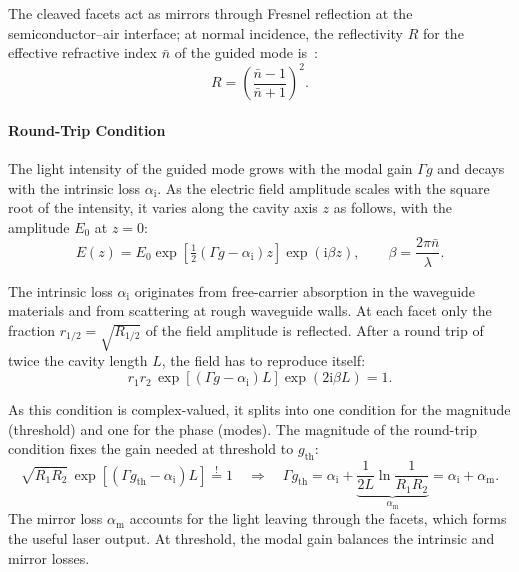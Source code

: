 The cleaved facets act as mirrors through Fresnel reflection at the
semiconductor–air interface; at normal incidence, the reflectivity $R$ for the
effective refractive index $\bar n$ of the guided mode is~\cite{grundmann_physics_2021}:
\begin{equation}
	R=\left(\frac{\bar n-1}{\bar n+1}\right)^{2}.
\end{equation}

\paragraph{Round-Trip Condition}

The light intensity of the guided mode grows with the modal gain $\Gamma g$ and
decays with the intrinsic loss $\alpha_{\mathrm{i}}$. As the electric field amplitude
scales with the square root of the intensity, it varies along the cavity axis $z$ as
follows, with the amplitude $E_{0}$ at $z=0$:
\begin{equation}
	E(z)=E_{0}\exp\left[\tfrac{1}{2}(\Gamma g-\alpha_{\mathrm{i}})z\right]\exp(\mathrm{i}
	\beta z),\qquad \beta=\frac{2\pi\bar n}{\lambda}.
\end{equation}

The intrinsic loss $\alpha_{\mathrm{i}}$ originates from free-carrier absorption in
the waveguide materials and from scattering at rough waveguide walls. At each
facet only the fraction $r_{1/2}=\sqrt{R_{1/2}}$ of the field amplitude is reflected. After
a round trip of twice the cavity length $L$, the field has to reproduce itself:
\begin{equation}
	r_{1} r_{2}\,\exp\left[(\Gamma g-\alpha_{\mathrm{i}})L\right]\exp(2\mathrm{i}\beta
	L)=1.
\end{equation}

As this condition is complex-valued, it splits into one condition for the
magnitude (threshold) and one for the phase (modes).
The magnitude of the round-trip condition fixes the gain needed at
threshold to $g_{\mathrm{th}}$:
\begin{equation}
	\sqrt{R_{1}R_{2}}\,\exp\left[(\Gamma g_{\mathrm{th}}-\alpha_{\mathrm{i}})L\right
	]\overset{!}{=}1 \quad\Rightarrow\quad \Gamma g_{\mathrm{th}}=\alpha_{\mathrm{i}}
	+\underbrace{\frac{1}{2L}\ln\frac{1}{R_{1}R_{2}}}_{\alpha_{\mathrm{m}}}=\alpha_{\mathrm{i}}
	+\alpha_{\mathrm{m}}.
\end{equation}
The mirror loss $\alpha_{\mathrm{m}}$ accounts for the light leaving through the
facets, which forms the useful laser output. At threshold, the modal gain balances
the intrinsic and mirror losses.

